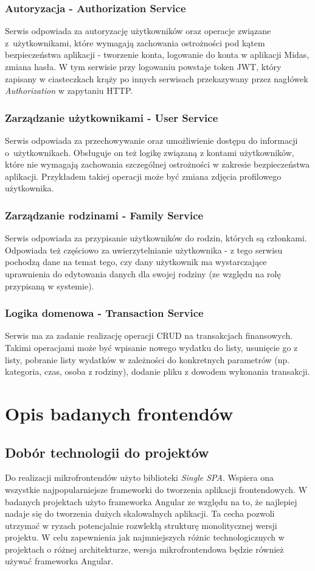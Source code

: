\documentclass{SGGW-thesis}
\begin{document}
{\subsection{Autoryzacja - Authorization Service}
Serwis odpowiada za autoryzację użytkowników oraz operacje związane z~użytkownikami, które wymagają zachowania ostrożności pod kątem bezpieczeństwa aplikacji - tworzenie konta, logowanie do konta w aplikacji Midas, zmiana hasła. W tym serwisie przy logowaniu powstaje token JWT, który zapisany w ciasteczkach krąży po innych serwisach przekazywany przez nagłówek \textit{Authorization} w zapytaniu HTTP.

\subsection{Zarządzanie użytkownikami - User Service}
Serwis odpowiada za przechowywanie oraz umożliwienie dostępu do informacji o~użytkownikach. Obsługuje on też logikę związaną z kontami użytkowników, które nie wymagają zachowania szczególnej ostrożności w zakresie bezpieczeństwa aplikacji. Przykładem takiej operacji może być zmiana zdjęcia profilowego użytkownika.

\subsection{Zarządzanie rodzinami - Family Service}
Serwis odpowiada za przypisanie użytkowników do rodzin, których są członkami. Odpowiada też częściowo za uwierzytelnianie użytkownika - z tego serwisu pochodzą dane na temat tego, czy dany użytkownik ma wystarczające uprawnienia do edytowania danych dla swojej rodziny (ze względu na rolę przypisaną w systemie).

\subsection{Logika domenowa - Transaction Service}
Serwis ma za zadanie realizację operacji CRUD na transakcjach finansowych. Takimi operacjami może być wpisanie nowego wydatku do listy, usunięcie go z listy, pobranie listy wydatków w zależności do konkretnych parametrów (np. kategoria, czas, osoba z rodziny), dodanie pliku z dowodem wykonania transakcji.

\chapter{Opis badanych frontendów}
\section{Dobór technologii do projektów}
Do realizacji mikrofrontendów użyto biblioteki \textit{Single SPA}. Wspiera ona wszystkie najpopularniejsze frameworki do tworzenia aplikacji frontendowych. W badanych projektach użyto frameworka Angular ze względu na to, że najlepiej nadaje się do tworzenia dużych skalowalnych aplikacji. Ta cecha pozwoli utrzymać w ryzach potencjalnie rozwlekłą strukturę monolitycznej wersji projektu. W celu zapewnienia jak najmniejszych różnic technologicznych w projektach o różnej architekturze, wersja mikrofrontendowa będzie również używać frameworka Angular.

}
\end{document}
